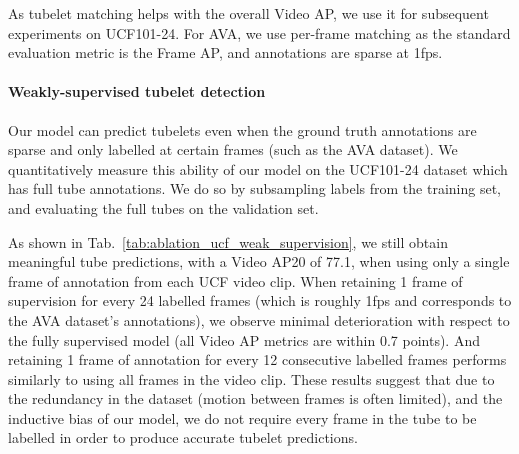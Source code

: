 \documentclass[10pt,twocolumn,letterpaper]{article}
\def \paravspace {-0.7\baselineskip}
\begin{document}
As tubelet matching helps with the overall Video AP, we use it for subsequent experiments on UCF101-24.
For AVA, we use per-frame matching as the standard evaluation metric is the Frame AP, and annotations are sparse at 1fps.

\vspace{\paravspace}
\paragraph{Weakly-supervised tubelet detection}
\begin{table}[t]
\caption{
Our model can predict tubelets even when the ground truth annotations are sparse.
We show this by subsampling training annotations from the UCF101-24 dataset.
Our model sees minimal performance deterioration even when using only  or 4\% of the annotated frames.
}

\label{tab:ablation_ucf_weak_supervision}
\vspace{-0.5\baselineskip}
\end{table} 
Our model can predict tubelets even when the ground truth annotations are sparse and only labelled at certain frames (such as the AVA dataset).
We quantitatively measure this ability of our model on the UCF101-24 dataset which has full tube annotations.
We do so by subsampling labels from the training set, and evaluating the full tubes on the validation set.

As shown in Tab.~\ref{tab:ablation_ucf_weak_supervision}, we still obtain meaningful tube predictions, with a Video AP20 of 77.1, when using only a single frame of annotation from each UCF video clip.
When retaining 1 frame of supervision for every 24 labelled frames (which is roughly 1fps and corresponds to the AVA dataset's annotations), we observe minimal deterioration with respect to the fully supervised model (all Video AP metrics are within 0.7 points).
And retaining 1 frame of annotation for every 12 consecutive labelled frames performs similarly to using all frames in the video clip.
These results suggest that due to the redundancy in the dataset (motion between frames is often limited), and the inductive bias of our model, we do not require every frame in the tube to be labelled in order to produce accurate tubelet predictions.
\end{document}
